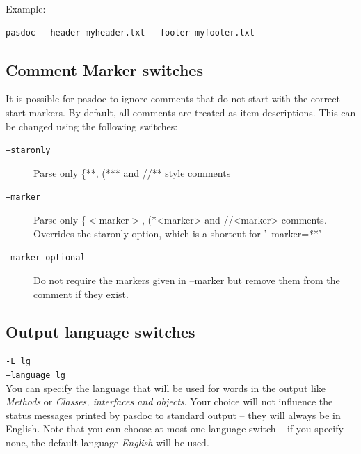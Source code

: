 \documentclass[11pt]{article}
\begin{document}
Example:
\begin{verbatim}
pasdoc --header myheader.txt --footer myfooter.txt
\end{verbatim}



\subsection{Comment Marker switches}
\label{specifymarkers}

It is possible for pasdoc to ignore comments that do not
start with the correct start markers. By default, all
comments are treated as item descriptions. This can
be changed using the following switches:

\begin{description}
\item[{\tt --staronly}] Parse only \{**, (*** and //** style comments
\item[{\tt --marker}] Parse only \{$<$marker$>$, (*<marker> and //<marker>
comments. Overrides the staronly option, which is a shortcut for
'--marker=**'
\item[{\tt --marker-optional}] Do not require the markers given in --marker but
remove them from the comment if they exist.
\end{description}

\subsection{Output language switches}

{\tt -L lg}\\
{\tt --language lg}\\


You can specify the language that will be used for words in the output like
\emph{Methods} or \emph{Classes, interfaces and objects}.
Your choice will not influence the status messages printed by pasdoc to
standard output -- they will always be in English.
Note that you can choose at most one language switch -- if you specify none,
the default language \emph{English} will be used.
\end{document}
